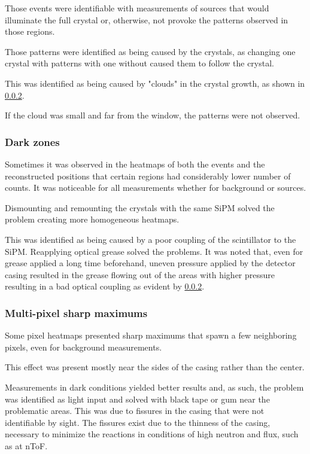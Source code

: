 Those events were identifiable with measurements of sources that would illuminate the full crystal or, otherwise, not provoke the patterns observed in those regions.

Those patterns were identified as being caused by the crystals, as changing one crystal with patterns with one without caused them to follow the crystal.

This was identified as being caused by "clouds" in the crystal growth, as shown in \ref{}.

If the cloud was small and far from the window, the patterns were not observed.

\subsubsection{Dark zones}

Sometimes it was observed in the heatmaps of both the events and the reconstructed positions that certain regions had considerably lower number of counts. It was  noticeable for all measurements whether for background or sources.

Dismounting and remounting the crystals with the same \ac{SiPM} solved the problem creating more homogeneous heatmaps.

This was identified as being caused by a poor coupling of the scintillator to the \ac{SiPM}. Reapplying optical grease solved the problems. It was noted that, even for grease applied a long time beforehand, uneven pressure applied by the detector casing resulted in the grease flowing out of the areas with higher pressure resulting in a bad optical coupling as evident by \ref{}.

\subsubsection{Multi-pixel sharp maximums}

Some pixel heatmaps presented sharp maximums that spawn a few neighboring pixels, even for background measurements.

This effect was present mostly near the sides of the casing rather than the center.

Measurements in dark conditions yielded better results and, as such, the problem was identified as light input and solved with black tape or gum near the problematic areas. This was due to fissures in the casing that were not identifiable by sight. The fissures exist due to the thinness of the casing, necessary to minimize the reactions in conditions of high neutron and \gamma flux, such as at \ac{nToF}.

